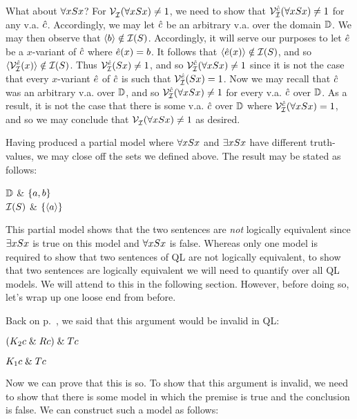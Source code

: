 What about $\forall x Sx$?
For $\mathcal{V}_{\mathcal{I}}^{}(\forall xSx)\neq 1$, we need to show that $\mathcal{V}_{\mathcal{I}}^{\hat{c}}(\forall xSx)\neq 1$ for any v.a. $\hat{c}$.
Accordingly, we may let $\hat{c}$ be an arbitrary v.a. over the domain $\mathbb{D}$.
We may then observe that $\langle b\rangle\notin\mathcal{I}(S)$.
Accordingly, it will serve our purposes to let $\hat{e}$ be a $x$-variant of $\hat{c}$ where $\hat{e}(x)=b$.
It follows that $\langle\hat{e}(x)\rangle\notin\mathcal{I}(S)$, and so $\langle\mathcal{V}_{\mathcal{I}}^{\hat{e}}(x)\rangle\notin\mathcal{I}(S)$.
Thus $\mathcal{V}_{\mathcal{I}}^{\hat{e}}(Sx)\neq 1$, and so $\mathcal{V}_{\mathcal{I}}^{\hat{c}}(\forall xSx)\neq 1$ since it is not the case that every $x$-variant $\hat{e}$ of $\hat{c}$ is such that $\mathcal{V}_{\mathcal{I}}^{\hat{e}}(Sx)=1$. 
Now we may recall that $\hat{c}$ was an arbitrary v.a. over $\mathbb{D}$, and so $\mathcal{V}_{\mathcal{I}}^{\hat{c}}(\forall xSx)\neq 1$ for every v.a. $\hat{c}$ over $\mathbb{D}$.
As a result, it is not the case that there is some v.a. $\hat{c}$ over $\mathbb{D}$ where $\mathcal{V}_{\mathcal{I}}^{\hat{c}}(\forall xSx)=1$, and so we may conclude that $\mathcal{V}_{\mathcal{I}}^{}(\forall xSx)\neq 1$ as desired. 

Having produced a partial model where $\forall x Sx$ and $\exists x Sx$ have different truth-values, we may close off the sets we defined above. 
The result may be stated as follows:

\begin{partialmodel}
  $\mathbb{D}$			& $\lbrace a,b\rbrace$\\
	$\mathcal{I}(S)$ 	& $\lbrace\langle a\rangle\rbrace$\\
\end{partialmodel}

This partial model shows that the two sentences are \emph{not} logically equivalent since $\exists x Sx$ is true on this model and $\forall x Sx$ is false.
Whereas only one model is required to show that two sentences of QL are not logically equivalent, to show that two sentences are logically equivalent we will need to quantify over all QL models.
We will attend to this in the following section.
However, before doing so, let's wrap up one loose end from before.

Back on p.~\pageref{surgeon3correct}, we said that this argument would be invalid in QL:
\begin{earg}
\item[] $(K_2c \mathrel\& Rc) \mathrel\& Tc$
\item[\therefore] $K_1c \mathrel\& Tc$
\end{earg}
Now we can prove that this is so. To show that this argument is invalid, we need to show that there is some model in which the premise is true and the conclusion is false. We can construct such a model as follows:

